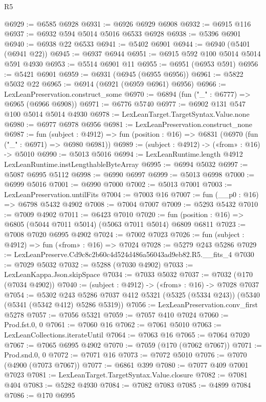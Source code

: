 \begin{lexlean}{R5}
\begin{coremodule}
@6929 := @6585 @6928
@6931 := @6926 @6929 @6908
@6932 := @6915 @116
@6937 := @6932 @594 @5014 @5016 @6533 @6928
@6938 := @5396 @6901
@6940 := @6938 @22 @6533
@6941 := @5402 @6901
@6944 := @6940 (@5401 (@6941 @22))
@6945 := @6937 @6944
@6951 := @6915 @592 @100 @5014 @5014 @591 @4930
@6953 := @5514 @6901 @11
@6955 := @6951 (@6953 @591)
@6956 := @5421 @6901
@6959 := @6931 (@6945 (@6955 @6956))
@6961 := @5822 @5032 @22
@6965 := @6914 (@6921 (@6959 @6961) @6956)
@6966 := LexLeanPreservation.construct_some
@6970 := @6894 (fun ("_" : @6777) => @6965 (@6966 @6908))
@6971 := @6776 @5740
@6977 := @6902 @131 @547 @100 @5014 @5014 @4930
@6978 := LexLeanTarget.TargetSyntax.Value.none
@6980 := @6977 @6978 @6956
@6981 := LexLeanPreservation.construct_none
@6987 := fun (subject : @4912) =>
  fun (position : @16) => @6831 (@6970 (fun ("_" : @6971) => @6980 @6981))
@6989 := (subject : @4912) -> («from» : @16) -> @5010
@6990 := @5013 @5016
@6994 := LexLeanRuntime.length @4912 LexLeanRuntime.instLengthableByteArray
@6995 := @6994 @5032
@6997 := @5087 @6995 @5112
@6998 := @6990 @6997
@6999 := @5013 @6998
@7000 := @6999 @5016
@7001 := @6990 @7000
@7002 := @5013 @7001
@7003 := LexLeanPreservation.untilFits
@7004 := @7003 @16
@7007 := fun (__p0 : @16) => @6798 @5432 @4902
@7008 := @7004 @7007
@7009 := @5293 @5432
@7010 := @7009 @4902
@7011 := @6423 @7010
@7020 := fun (position : @16) => @6805 (@5044 @7011 @5014) (@5063 @7011 @5014) @6809 @6811
@7023 := @7008 @7020 @6995 @4902
@7024 := @7002 @7023
@7026 := fun (subject : @4912) => fun («from» : @16) => @7024
@7028 := @5279 @243 @5286
@7029 := LexLeanPreserve.Cd9c8c2b60c4d524d486a56043ad9eb82.R5.__fits_4
@7030 := @7029 @5032
@7032 := @5288 (@7030 @4902)
@7033 := LexLeanKappa.Json.skipSpace
@7034 := @7033 @5032
@7037 := @7032 (@170 (@7034 @4902))
@7040 := (subject : @4912) -> («from» : @16) -> @7028 @7037
@7054 := @5302
    @243
    @5286
    @7037
    @412
    @5321
    (@5325 (@5334 @243))
    (@5340 (@5341 (@5342 @412) @5286 @5319))
@7056 := LexLeanPreservation.conv_first @5278
@7057 := @7056 @5321
@7059 := @7057 @410 @7024
@7060 := Prod.fst.{0, 0}
@7061 := @7060 @16
@7062 := @7061 @5010
@7063 := LexLeanCollections.iterateUntil
@7064 := @7063 @16
@7065 := @7064 @7020
@7067 := @7065 @6995 @4902
@7070 := @7059 (@170 (@7062 @7067))
@7071 := Prod.snd.{0, 0}
@7072 := @7071 @16
@7073 := @7072 @5010
@7076 := @7070 (@4900 (@7073 @7067))
@7077 := @6861 @399
@7080 := @7077 @409 @7001 @7023
@7081 := LexLeanTarget.TargetSyntax.Value.closure
@7082 := @7081 @404
@7083 := @5282 @4930
@7084 := @7082 @7083
@7085 := @4899 @7084
@7086 := @170 @6995

\end{coremodule}
\end{lexlean}
